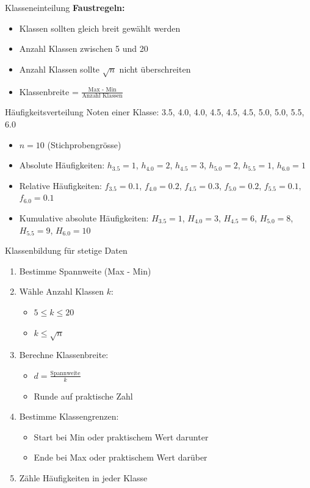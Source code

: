 \begin{KR}{Klasseneinteilung}
\textbf{Faustregeln:}
\begin{itemize}
    \item Klassen sollten gleich breit gewählt werden
    \item Anzahl Klassen zwischen 5 und 20
    \item Anzahl Klassen sollte $\sqrt{n}$ nicht überschreiten
    \item Klassenbreite = $\frac{\text{Max - Min}}{\text{Anzahl Klassen}}$
\end{itemize}
\end{KR}

\begin{example2}{Häufigkeitsverteilung}
Noten einer Klasse: 3.5, 4.0, 4.0, 4.5, 4.5, 4.5, 5.0, 5.0, 5.5, 6.0
\begin{itemize}
    \item $n = 10$ (Stichprobengrösse)
    \item Absolute Häufigkeiten: $h_{3.5}=1$, $h_{4.0}=2$, $h_{4.5}=3$, $h_{5.0}=2$, $h_{5.5}=1$, $h_{6.0}=1$
    \item Relative Häufigkeiten: $f_{3.5}=0.1$, $f_{4.0}=0.2$, $f_{4.5}=0.3$, $f_{5.0}=0.2$, $f_{5.5}=0.1$, $f_{6.0}=0.1$
    \item Kumulative absolute Häufigkeiten: $H_{3.5}=1$, $H_{4.0}=3$, $H_{4.5}=6$, $H_{5.0}=8$, $H_{5.5}=9$, $H_{6.0}=10$
\end{itemize}
\end{example2}

\begin{KR}{Klassenbildung für stetige Daten}
\begin{enumerate}
    \item Bestimme Spannweite (Max - Min)
    \item Wähle Anzahl Klassen $k$:
        \begin{itemize}
            \item $5 \leq k \leq 20$
            \item $k \leq \sqrt{n}$
        \end{itemize}
    \item Berechne Klassenbreite:
        \begin{itemize}
            \item $d = \frac{\text{Spannweite}}{k}$
            \item Runde auf praktische Zahl
        \end{itemize}
    \item Bestimme Klassengrenzen:
        \begin{itemize}
            \item Start bei Min oder praktischem Wert darunter
            \item Ende bei Max oder praktischem Wert darüber
        \end{itemize}
    \item Zähle Häufigkeiten in jeder Klasse
\end{enumerate}
\end{KR}

